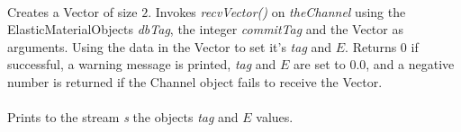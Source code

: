 \\
Creates a Vector of size $2$. Invokes {\em recvVector()} on  {\em
theChannel} using the ElasticMaterialObjects {\em dbTag}, the integer
{\em commitTag} and the Vector as arguments. Using the data in the
Vector to set it's {\em tag} and $E$. Returns $0$ if successful, a
warning message is printed, {\em tag} and $E$ are set to $0.0$, and a
negative number is returned if the Channel object fails to receive
the Vector. \\

 \\
Prints to the stream {\em s} the objects {\em tag} and $E$ values. \\
